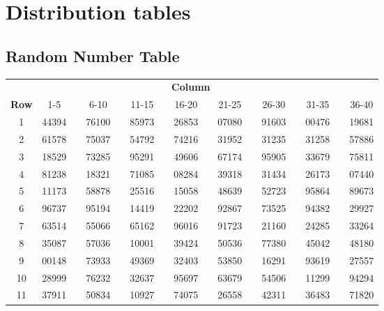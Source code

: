 \chapter{Distribution tables}
\label{distributionTables}

\section{Random Number Table}
\label{randomNumberTable}

\begin{center}
\begin{tabular}{cccc cccc cccc cccc}
& \multicolumn{14}{c}{\textbf{Column}} \\
\cline{2-16}
\textbf{Row} & 1-5 && 6-10 && 11-15 && 16-20 && 21-25 && 26-30 && 31-35 && 36-40 \\
\hline
1 & 44394 & \quad & 76100 & \quad & 85973 & \quad & 26853 & \quad & 07080 & \quad & 91603 & \quad & 00476 & \quad & 19681 \\
2 & 61578 & \quad & 75037 & \quad & 54792 & \quad & 74216 & \quad & 31952 & \quad & 31235 & \quad & 31258 & \quad & 57886 \\
3 & 18529 & \quad & 73285 & \quad & 95291 & \quad & 49606 & \quad & 67174 & \quad & 95905 & \quad & 33679 & \quad & 75811 \\
4 & 81238 & \quad & 18321 & \quad & 71085 & \quad & 08284 & \quad & 39318 & \quad & 31434 & \quad & 26173 & \quad & 07440 \\
5 & 11173 & \quad & 58878 & \quad & 25516 & \quad & 15058 & \quad & 48639 & \quad & 52723 & \quad & 95864 & \quad & 89673 \\
\hline
6 & 96737 & \quad & 95194 & \quad & 14419 & \quad & 22202 & \quad & 92867 & \quad & 73525 & \quad & 94382 & \quad & 29927 \\
7 & 63514 & \quad & 55066 & \quad & 65162 & \quad & 96016 & \quad & 91723 & \quad & 21160 & \quad & 24285 & \quad & 33264 \\
8 & 35087 & \quad & 57036 & \quad & 10001 & \quad & 39424 & \quad & 50536 & \quad & 77380 & \quad & 45042 & \quad & 48180 \\
9 & 00148 & \quad & 73933 & \quad & 49369 & \quad & 32403 & \quad & 53850 & \quad & 16291 & \quad & 93619 & \quad & 27557 \\
10 & 28999 & \quad & 76232 & \quad & 32637 & \quad & 95697 & \quad & 63679 & \quad & 54506 & \quad & 11299 & \quad & 94294 \\
\hline
11 & 37911 & \quad & 50834 & \quad & 10927 & \quad & 74075 & \quad & 26558 & \quad & 42311 & \quad & 36483 & \quad & 71820 \\

\end{tabular}
\end{center}
